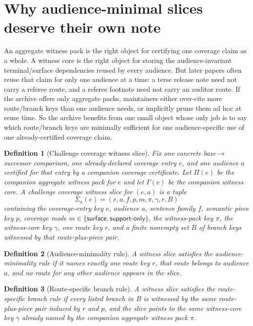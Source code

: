 \documentclass[11pt]{article}
\newtheorem{definition}{Definition}
\begin{document}
\section{Why audience-minimal slices deserve their own note}
An aggregate witness pack is the right object for certifying one coverage claim as a whole.
A witness core is the right object for storing the audience-invariant terminal/surface dependencies reused by every audience.
But later papers often reuse that claim for only one audience at a time: a terse release note need not carry a referee route, and a referee footnote need not carry an auditor route.
If the archive offers only aggregate packs, maintainers either over-cite more route/branch keys than one audience needs, or implicitly prune them ad hoc at reuse time.
So the archive benefits from one small object whose only job is to say which route/branch keys are minimally sufficient for one audience-specific use of one already-certified coverage claim.

\begin{definition}[Challenge coverage witness slice]
Fix one concrete base$\to$successor comparison, one already-declared coverage entry $e$, and one audience $a$ certified for that entry by a companion coverage certificate.
Let $\Pi(e)$ be the companion aggregate witness pack for $e$ and let $\Gamma(e)$ be the companion witness core.
A \emph{challenge coverage witness slice} for $(e,a)$ is a tuple
\[
\Sigma_a(e)=(e,a,f,p,m,\pi,\gamma,r,B)
\]
containing the coverage-entry key $e$, audience $a$, sentence family $f$, semantic piece key $p$, coverage mode $m\in\{\textsf{surface},\textsf{support-only}\}$, the witness-pack key $\pi$, the witness-core key $\gamma$, one route key $r$, and a finite nonempty set $B$ of branch keys witnessed by that route-plus-piece pair.
\end{definition}

\begin{definition}[Audience-minimality rule]
A witness slice satisfies the \emph{audience-minimality rule} if it names exactly one route key $r$, that route belongs to audience $a$, and no route for any other audience appears in the slice.
\end{definition}

\begin{definition}[Route-specific branch rule]
A witness slice satisfies the \emph{route-specific branch rule} if every listed branch in $B$ is witnessed by the same route-plus-piece pair induced by $r$ and $p$, and the slice points to the same witness-core key $\gamma$ already named by the companion aggregate witness pack $\pi$.
\end{definition}
\end{document}
